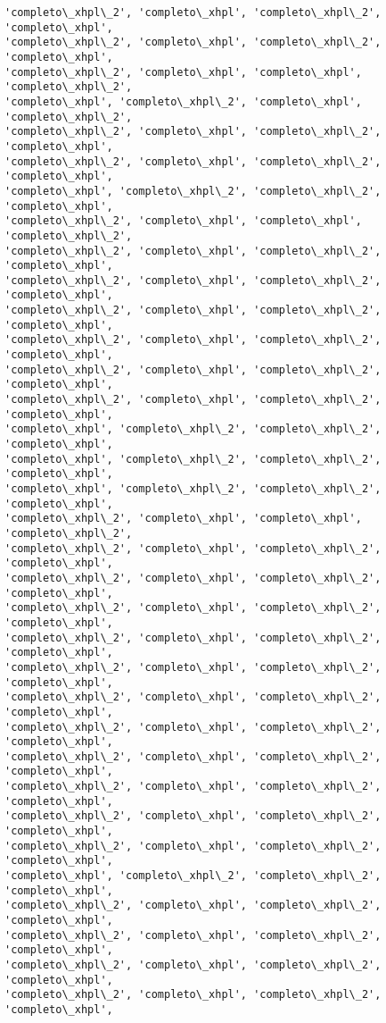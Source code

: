 \documentclass[11pt]{article}
\begin{document}
\begin{Verbatim}[commandchars=\\\{\}]
'completo\_xhpl\_2', 'completo\_xhpl', 'completo\_xhpl\_2', 'completo\_xhpl',
'completo\_xhpl\_2', 'completo\_xhpl', 'completo\_xhpl\_2', 'completo\_xhpl',
'completo\_xhpl\_2', 'completo\_xhpl', 'completo\_xhpl', 'completo\_xhpl\_2',
'completo\_xhpl', 'completo\_xhpl\_2', 'completo\_xhpl', 'completo\_xhpl\_2',
'completo\_xhpl\_2', 'completo\_xhpl', 'completo\_xhpl\_2', 'completo\_xhpl',
'completo\_xhpl\_2', 'completo\_xhpl', 'completo\_xhpl\_2', 'completo\_xhpl',
'completo\_xhpl', 'completo\_xhpl\_2', 'completo\_xhpl\_2', 'completo\_xhpl',
'completo\_xhpl\_2', 'completo\_xhpl', 'completo\_xhpl', 'completo\_xhpl\_2',
'completo\_xhpl\_2', 'completo\_xhpl', 'completo\_xhpl\_2', 'completo\_xhpl',
'completo\_xhpl\_2', 'completo\_xhpl', 'completo\_xhpl\_2', 'completo\_xhpl',
'completo\_xhpl\_2', 'completo\_xhpl', 'completo\_xhpl\_2', 'completo\_xhpl',
'completo\_xhpl\_2', 'completo\_xhpl', 'completo\_xhpl\_2', 'completo\_xhpl',
'completo\_xhpl\_2', 'completo\_xhpl', 'completo\_xhpl\_2', 'completo\_xhpl',
'completo\_xhpl\_2', 'completo\_xhpl', 'completo\_xhpl\_2', 'completo\_xhpl',
'completo\_xhpl', 'completo\_xhpl\_2', 'completo\_xhpl\_2', 'completo\_xhpl',
'completo\_xhpl', 'completo\_xhpl\_2', 'completo\_xhpl\_2', 'completo\_xhpl',
'completo\_xhpl', 'completo\_xhpl\_2', 'completo\_xhpl\_2', 'completo\_xhpl',
'completo\_xhpl\_2', 'completo\_xhpl', 'completo\_xhpl', 'completo\_xhpl\_2',
'completo\_xhpl\_2', 'completo\_xhpl', 'completo\_xhpl\_2', 'completo\_xhpl',
'completo\_xhpl\_2', 'completo\_xhpl', 'completo\_xhpl\_2', 'completo\_xhpl',
'completo\_xhpl\_2', 'completo\_xhpl', 'completo\_xhpl\_2', 'completo\_xhpl',
'completo\_xhpl\_2', 'completo\_xhpl', 'completo\_xhpl\_2', 'completo\_xhpl',
'completo\_xhpl\_2', 'completo\_xhpl', 'completo\_xhpl\_2', 'completo\_xhpl',
'completo\_xhpl\_2', 'completo\_xhpl', 'completo\_xhpl\_2', 'completo\_xhpl',
'completo\_xhpl\_2', 'completo\_xhpl', 'completo\_xhpl\_2', 'completo\_xhpl',
'completo\_xhpl\_2', 'completo\_xhpl', 'completo\_xhpl\_2', 'completo\_xhpl',
'completo\_xhpl\_2', 'completo\_xhpl', 'completo\_xhpl\_2', 'completo\_xhpl',
'completo\_xhpl\_2', 'completo\_xhpl', 'completo\_xhpl\_2', 'completo\_xhpl',
'completo\_xhpl\_2', 'completo\_xhpl', 'completo\_xhpl\_2', 'completo\_xhpl',
'completo\_xhpl', 'completo\_xhpl\_2', 'completo\_xhpl\_2', 'completo\_xhpl',
'completo\_xhpl\_2', 'completo\_xhpl', 'completo\_xhpl\_2', 'completo\_xhpl',
'completo\_xhpl\_2', 'completo\_xhpl', 'completo\_xhpl\_2', 'completo\_xhpl',
'completo\_xhpl\_2', 'completo\_xhpl', 'completo\_xhpl\_2', 'completo\_xhpl',
'completo\_xhpl\_2', 'completo\_xhpl', 'completo\_xhpl\_2', 'completo\_xhpl',

\end{Verbatim}
\end{document}
